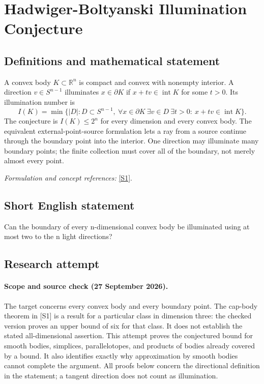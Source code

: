 \documentclass[11pt]{article}
\begin{document}
\section*{\texorpdfstring{Hadwiger-Boltyanski Illumination Conjecture}{Hadwiger-Boltyanski Illumination Conjecture}}\label{473}
\subsection{Definitions and mathematical statement}
A convex body $K\subset{\mathbb{R}}^n$ is compact and convex with nonempty interior. A direction $v\in S^{n-1}$ illuminates $x\in\partial K$ if $x+tv\in\operatorname{int}K$ for some $t>0$. Its illumination number is
\[
 I(K)=\min\{|D|:D\subset S^{n-1},\
 \forall x\in\partial K\ \exists v\in D\ \exists t>0:\
 x+tv\in\operatorname{int}K\}.
\]
The conjecture is $I(K)\le2^n$ for every dimension and every convex body. The equivalent external-point-source formulation lets a ray from a source continue through the boundary point into the interior. One direction may illuminate many boundary points; the finite collection must cover all of the boundary, not merely almost every point.
\par\smallskip\textit{Formulation and concept references:} \href{https://arxiv.org/pdf/2507.08712}{[S1]}.

\subsection{Short English statement}
Can the boundary of every n-dimensional convex body be illuminated using at most two to the n light directions?
\subsection{Research attempt}
\paragraph{Scope and source check (27 September 2026).}
The target concerns every convex body and every boundary point. The cap-body theorem in [S1] is a result for a particular class in dimension three: the checked version proves an upper bound of six for that class. It does not establish the stated all-dimensional assertion. This attempt proves the conjectured bound for smooth bodies, simplices, parallelotopes, and products of bodies already covered by a bound. It also identifies exactly why approximation by smooth bodies cannot complete the argument. All proofs below concern the directional definition in the statement; a tangent direction does not count as illumination.
\end{document}
